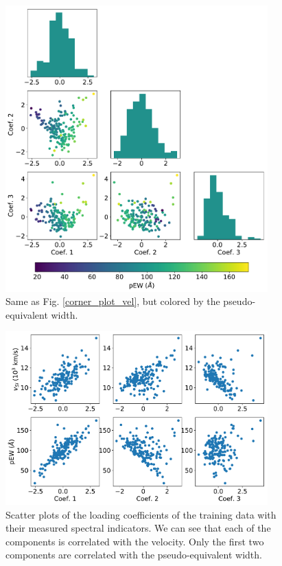 \begin{figure}[htbp]
    \centering
    \includegraphics[width=0.9\textwidth]{figures/si_feat_pca/corner_plot_ew.pdf}
    \caption{Same as Fig. \ref{corner_plot_vel}, but colored by the pseudo-equivalent width.}
    \label{corner_plot_ew}
\end{figure}

\begin{figure}[htbp]
    \centering
    \includegraphics[width=0.9\textwidth]{figures/si_feat_pca/coef_vs_vel_and_ew.pdf}
    \caption{Scatter plots of the loading coefficients of the training data with their measured spectral indicators. We can see that each of the components is correlated with the velocity. Only the first two components are correlated with the pseudo-equivalent width.}
    \label{scatter_loading}
\end{figure}

